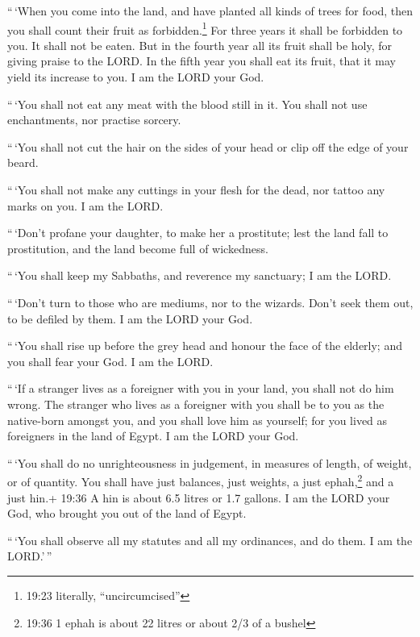  ``\,`When you come into the land, and have planted all
kinds of trees for food, then you shall count their fruit as
forbidden.\footnote{19:23 literally, ``uncircumcised''} For three years
it shall be forbidden to you. It shall not be eaten.  But
in the fourth year all its fruit shall be holy, for giving praise to the
LORD.  In the fifth year you shall eat its fruit, that it
may yield its increase to you. I am the LORD your God.

 ``\,`You shall not eat any meat with the blood still in
it. You shall not use enchantments, nor practise sorcery.

 ``\,`You shall not cut the hair on the sides of your head
or clip off the edge of your beard.

 ``\,`You shall not make any cuttings in your flesh for the
dead, nor tattoo any marks on you. I am the LORD.

 ``\,`Don't profane your daughter, to make her a
prostitute; lest the land fall to prostitution, and the land become full
of wickedness.

 ``\,`You shall keep my Sabbaths, and reverence my
sanctuary; I am the LORD.

 ``\,`Don't turn to those who are mediums, nor to the
wizards. Don't seek them out, to be defiled by them. I am the LORD your
God.

 ``\,`You shall rise up before the grey head and honour the
face of the elderly; and you shall fear your God. I am the LORD.

 ``\,`If a stranger lives as a foreigner with you in your
land, you shall not do him wrong.  The stranger who lives
as a foreigner with you shall be to you as the native-born amongst you,
and you shall love him as yourself; for you lived as foreigners in the
land of Egypt. I am the LORD your God.

 ``\,`You shall do no unrighteousness in judgement, in
measures of length, of weight, or of quantity.  You shall
have just balances, just weights, a just ephah,\footnote{19:36 1 ephah
  is about 22 litres or about 2/3 of a bushel} and a just hin.+ 19:36 A
hin is about 6.5 litres or 1.7 gallons. I am the LORD your God, who
brought you out of the land of Egypt.

 ``\,`You shall observe all my statutes and all my
ordinances, and do them. I am the LORD.'\,''

